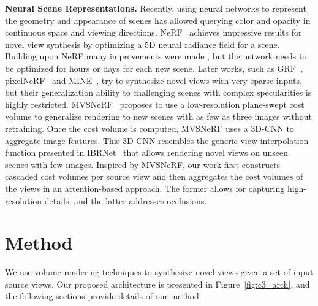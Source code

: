 \noindent\textbf{Neural Scene Representations.} Recently, using neural networks to represent the geometry and appearance of scenes has allowed querying color and opacity in continuous space and viewing directions. NeRF~\citep{mildenhall2020nerf} achieves impressive results for novel view synthesis by optimizing a 5D neural radiance field for a scene. Building upon NeRF many improvements were made \citep{park2021nerfies, li2021neural, martin2021nerf, peng2021neural, schwarz2020graf, srinivasan2021nerv, rockwell2021pixelsynth, DeVries_2021_ICCV, Barron_2021_ICCV}, but the network needs to be optimized for hours or days for each new scene. Later works, such as GRF~\citep{trevithick2021grf}, pixelNeRF~\citep{yu2021pixelnerf} and MINE~\citep{li2021mine}, try to synthesize novel views with very sparse inputs, but their generalization ability to challenging scenes with complex specularities is highly restricted.
MVSNeRF~\citep{chen2021mvsnerf} proposes to use a low-resolution plane-swept cost volume to generalize rendering to new scenes with as few as three images without retraining. Once the cost volume is computed, MVSNeRF uses a 3D-CNN to aggregate image features. This 3D-CNN resembles the generic view interpolation function presented in IBRNet~\citep{wang2021ibrnet} that allows rendering novel views on unseen scenes with few images. Inspired by MVSNeRF, our work first constructs cascaded cost volumes per source view and then aggregates the cost volumes of the views in an attention-based approach. The former allows for capturing high-resolution details, and the latter addresses occlusions.

\section{Method}
\label{sec:c3_method}
We use volume rendering techniques to synthesize novel views given a set of input source views. Our proposed architecture is presented in Figure~\ref{fig:c3_arch}, and the following sections provide details of our method.

